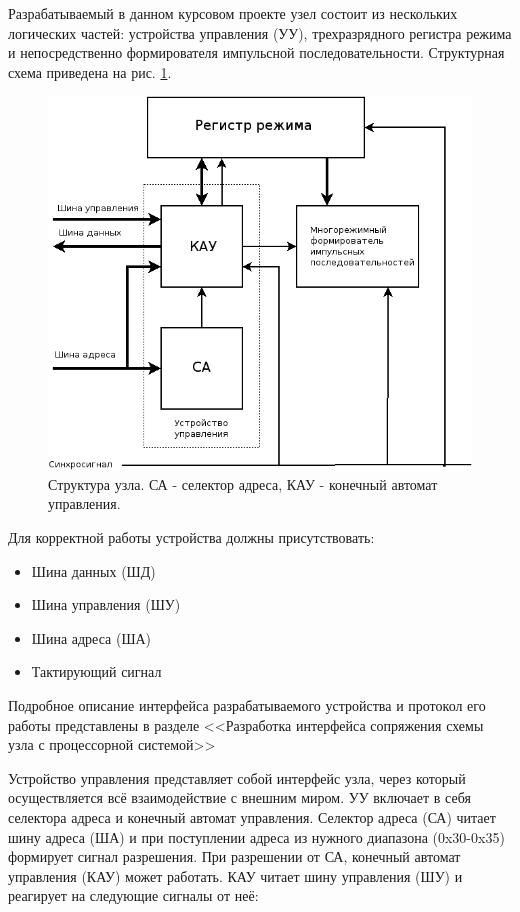 Разрабатываемый в данном курсовом проекте узел состоит из нескольких логических частей: устройства управления (УУ), трехразрядного регистра режима и непосредственно формирователя импульсной последовательности. Структурная схема приведена на рис. \ref{fig:structure}.\\

\begin{figure}
  \includegraphics[scale=0.58]{./structure.png}
  \caption{Структура узла. СА - селектор адреса, КАУ - конечный автомат управления.}
  \label{fig:structure}
\end{figure}

Для корректной работы устройства должны присутствовать:
\begin{itemize}
\item Шина данных (ШД)
\item Шина управления (ШУ)
\item Шина адреса (ША)
\item Тактирующий сигнал
\end{itemize}

Подробное описание интерфейса разрабатываемого устройства и протокол его работы представлены в разделе <<Разработка интерфейса сопряжения схемы узла с процессорной системой>>

Устройство управления представляет собой интерфейс узла, через который осуществляется всё взаимодействие с внешним миром. УУ включает в себя селектора адреса и конечный автомат управления. Селектор адреса (СА) читает шину адреса (ША) и при поступлении адреса из нужного диапазона (0x30-0x35) формирует сигнал разрешения. При разрешении от СА, конечный автомат управления (КАУ) может работать. КАУ читает шину управления (ШУ) и реагирует на следующие сигналы от неё: \\